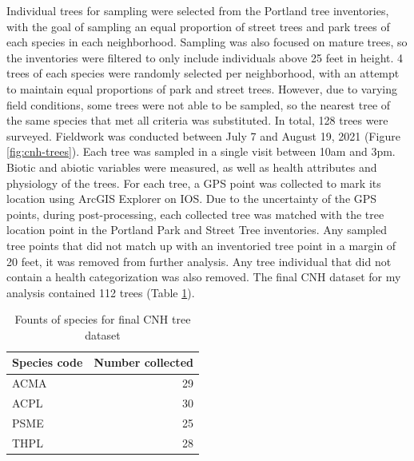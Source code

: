 \documentclass[12pt,twoside]{reedthesis}
\begin{document}
Individual trees for sampling were selected from the Portland tree inventories, with the goal of sampling an equal proportion of street trees and park trees of each species in each neighborhood. Sampling was also focused on mature trees, so the inventories were filtered to only include individuals above 25 feet in height. 4 trees of each species were randomly selected per neighborhood, with an attempt to maintain equal proportions of park and street trees. However, due to varying field conditions, some trees were not able to be sampled, so the nearest tree of the same species that met all criteria was substituted. In total, 128 trees were surveyed. Fieldwork was conducted between July 7 and August 19, 2021 (Figure \ref{fig:cnh-trees}). Each tree was sampled in a single visit between 10am and 3pm. Biotic and abiotic variables were measured, as well as health attributes and physiology of the trees. For each tree, a GPS point was collected to mark its location using ArcGIS Explorer on IOS. Due to the uncertainty of the GPS points, during post-processing, each collected tree was matched with the tree location point in the Portland Park and Street Tree inventories. Any sampled tree points that did not match up with an inventoried tree point in a margin of 20 feet, it was removed from further analysis. Any tree individual that did not contain a health categorization was also removed. The final CNH dataset for my analysis contained 112 trees (Table \ref{tab:cnh-tree-counts}).
\begin{table}

\caption[Final CNH Tree counts]{\label{tab:cnh-tree-counts}Founts of species for final CNH tree dataset}
\centering
\begin{tabular}[t]{lr}
\toprule
Species code & Number collected\\
\midrule
ACMA & 29\\
ACPL & 30\\
PSME & 25\\
THPL & 28\\
\bottomrule
\end{tabular}
\end{table}
\end{document}
